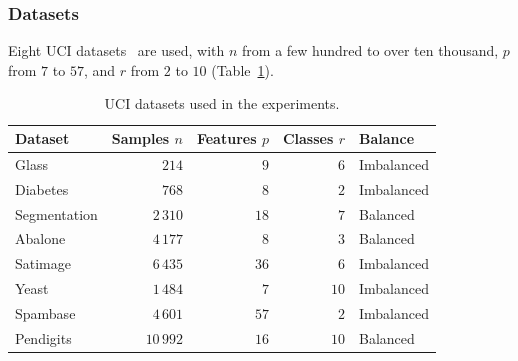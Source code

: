 \documentclass[]{interact}
\theoremstyle{plain}
\theoremstyle{definition}
\theoremstyle{remark}
\begin{document}
\subsubsection{Datasets}\label{sssec:datasets}
Eight UCI datasets~\citep{kelly2023uci} are used, with $n$ from a few hundred to over ten thousand, $p$ from $7$ to $57$, and $r$ from $2$ to $10$ (Table~\ref{tab:datasets}).
\begin{table}[htbp]
\centering
\caption{UCI datasets used in the experiments.}\label{tab:datasets}
\begin{tabular}{lrrrl}
\toprule
Dataset      & Samples $n$ & Features $p$ & Classes $r$ & Balance    \\
\midrule
Glass        & $214$       & $9$          & $6$         & Imbalanced \\
Diabetes     & $768$       & $8$          & $2$         & Imbalanced \\
Segmentation & $2\,310$    & $18$         & $7$         & Balanced   \\
Abalone      & $4\,177$    & $8$          & $3$         & Balanced   \\
Satimage     & $6\,435$    & $36$         & $6$         & Imbalanced \\
Yeast        & $1\,484$    & $7$          & $10$        & Imbalanced \\
Spambase     & $4\,601$    & $57$         & $2$         & Imbalanced \\
Pendigits    & $10\,992$   & $16$         & $10$        & Balanced   \\
\bottomrule
\end{tabular}
\end{table}
\end{document}
